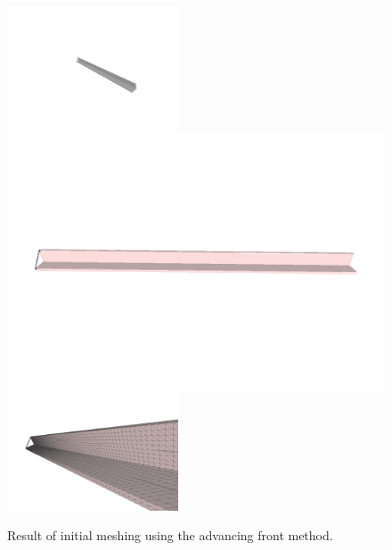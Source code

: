 \documentclass[12pt]{drexelthesis}
\begin{document}
\begin{figure}[!h]
	\label{zeronoise:advancingfront}
	\centering
		\includegraphics[trim={5in 2in 3in 3in},clip,width=2in]{simulated-lab-scan/0noise/clean/advancingfront.png}
		\includegraphics[trim={0 3in 0 3in},clip,width=6in]{simulated-lab-scan/0noise/clean/advancingfront01.png}
		\includegraphics[width=2in]{simulated-lab-scan/0noise/clean/advancingfront02.png}
		\caption[Initial meshing using a raw advancing front approach]{\centering  Result of initial meshing using the advancing front method.}
\end{figure}
\end{document}
